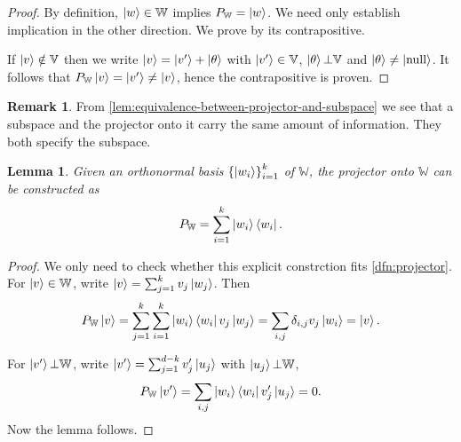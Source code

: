 \documentclass{article}
\theoremstyle{definition}
\newtheorem{rem}{Remark}[section]
\theoremstyle{plain}
\newtheorem{lem}{Lemma}[section]
\numberwithin{equation}{section}
\begin{document}
\begin{proof}
    By definition, $\ket{w} \in \mathbb{W}$ implies 
    $P_{\mathbb{W}}=\ket{w}$. We need only establish implication 
    in the other direction. We prove by its contrapositive. 

    If $\ket{v} \notin \mathbb{V}$ then we write 
    $\ket{v} = \ket{v'} + \ket{\theta}$ with 
    $\ket{v'} \in \mathbb{V}$, 
    $\ket{\theta} \bot \mathbb{V}$ and $\ket{\theta} \neq \ket{\text{null}}$. 
    It follows that $P_{\mathbb{W}} \ket{v} = \ket{v'} \neq \ket{v}$, hence 
    the contrapositive is proven.
\end{proof}

\begin{rem}
    From \cref{lem:equivalence-between-projector-and-subspace} we see that 
    a subspace and the projector onto it 
    carry the same amount of information. They both specify the subspace.
\end{rem}

\begin{lem}
    Given an orthonormal basis 
    $\left\{ \ket{w_{i}} \right\}_{i =1}^{k}$ 
    of $\mathbb{W}$, the projector onto $\mathbb{W}$ 
    can be constructed as 
    \begin{equation}
        P_{\mathbb{W}} 
        = 
        \sum_{i = 1}^{k} \ket{w_i} \bra{w_i}.
    \label{eqn:projector-construction-from-basis}
    \end{equation}
\end{lem}

\begin{proof}
    We only need to check 
    whether this explicit constrction fits 
    \cref{dfn:projector}.
    For $\ket{v}\in \mathbb{W}$, write 
    $\ket{v}= \sum_{j=1}^{k}v_j \ket{w_j}$. Then 
    \begin{equation}
        P_{\mathbb{W}}\ket{v}
        =
        \sum_{j=1}^{k}\sum_{i = 1}^{k}
        \ket{w_i}\bra{w_i} v_j \ket{w_j} 
        =
        \sum_{i,j} \delta_{i,j} v_j \ket{w_i} = \ket{v}.
    \end{equation}

    For $\ket{v'} \bot \mathbb{W}$, write 
    $\ket{v'} = \sum_{j=1}^{d-k} v'_j \ket{u_j}$ 
    with $\ket{u_j} \bot \mathbb{W}$, 
    \begin{equation}
        P_{\mathbb{W}}\ket{v'}
        =
        \sum_{i,j} \ket{w_i} \bra{w_i} v'_j \ket{u_j}
        =
        0.
    \end{equation}
    Now the lemma follows.
\end{proof}
\end{document}
